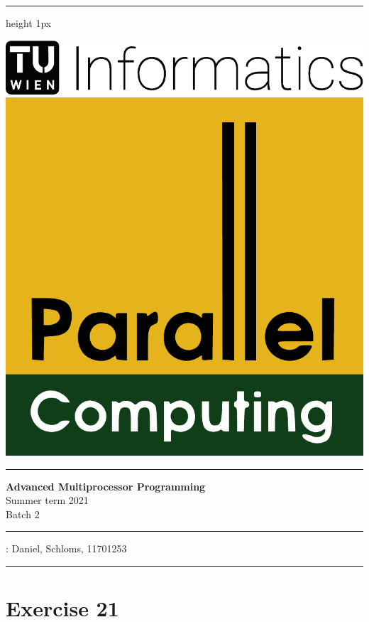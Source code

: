 \documentclass[a4paper,%
11pt,%
DIV=14,
headsepline,%
headings=normal,
]{scrartcl}
\newcommand{\exercise}[1]{\section*{Exercise #1}}
\begin{document}
\usetikzlibrary{shapes,arrows}

\noindent
\hrule height 1px
\vspace*{1ex}
\begin{minipage}[t]{.45\linewidth}
\strut\vspace*{-\baselineskip}\newline
\includegraphics[height=.9cm]{./figs/Inf-Logo_black_en.pdf}
\includegraphics[height=.9cm]{.//figs/par-logo}
\end{minipage}
\hfill
\begin{minipage}[t]{.5\linewidth}
\end{minipage}
\vspace*{1ex}

\hrule 

\vspace*{2ex}

\begin{center}
{\LARGE\textbf{Advanced Multiprocessor Programming}}\\
{\large{}%
  Summer term 2021\\
  Batch 2\\
}
\end{center}

\hrule 
\vspace*{1ex}

: Daniel, Schloms, 11701253\\

\vspace*{1ex}
\hrule 

\exercise{21}
\end{document}
